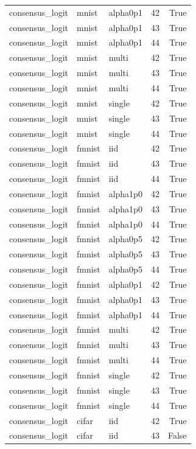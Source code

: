 \begin{tabular}{lllrr}
consensus\_logit & mnist & alpha0p1 & 42 & True \\
consensus\_logit & mnist & alpha0p1 & 43 & True \\
consensus\_logit & mnist & alpha0p1 & 44 & True \\
consensus\_logit & mnist & multi & 42 & True \\
consensus\_logit & mnist & multi & 43 & True \\
consensus\_logit & mnist & multi & 44 & True \\
consensus\_logit & mnist & single & 42 & True \\
consensus\_logit & mnist & single & 43 & True \\
consensus\_logit & mnist & single & 44 & True \\
consensus\_logit & fmnist & iid & 42 & True \\
consensus\_logit & fmnist & iid & 43 & True \\
consensus\_logit & fmnist & iid & 44 & True \\
consensus\_logit & fmnist & alpha1p0 & 42 & True \\
consensus\_logit & fmnist & alpha1p0 & 43 & True \\
consensus\_logit & fmnist & alpha1p0 & 44 & True \\
consensus\_logit & fmnist & alpha0p5 & 42 & True \\
consensus\_logit & fmnist & alpha0p5 & 43 & True \\
consensus\_logit & fmnist & alpha0p5 & 44 & True \\
consensus\_logit & fmnist & alpha0p1 & 42 & True \\
consensus\_logit & fmnist & alpha0p1 & 43 & True \\
consensus\_logit & fmnist & alpha0p1 & 44 & True \\
consensus\_logit & fmnist & multi & 42 & True \\
consensus\_logit & fmnist & multi & 43 & True \\
consensus\_logit & fmnist & multi & 44 & True \\
consensus\_logit & fmnist & single & 42 & True \\
consensus\_logit & fmnist & single & 43 & True \\
consensus\_logit & fmnist & single & 44 & True \\
consensus\_logit & cifar & iid & 42 & True \\
consensus\_logit & cifar & iid & 43 & False \\

\end{tabular}
